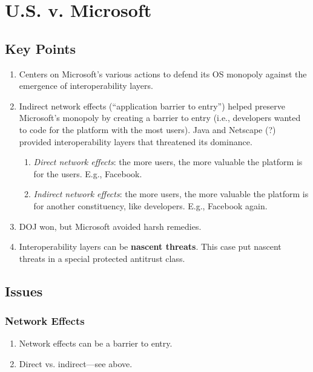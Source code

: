 \section{U.S. v. Microsoft}

\subsection{Key Points}

\begin{enumerate}
    \item Centers on Microsoft's various actions to defend its OS monopoly 
    against the emergence of interoperability layers.
    \item Indirect network effects (``application barrier to entry'') helped 
    preserve Microsoft's monopoly by creating a barrier to entry (i.e., 
    developers wanted to code for the platform with the most users). Java and 
    Netscape (?) provided interoperability layers that threatened its 
    dominance.
    \begin{enumerate}
        \item \emph{Direct network effects}: the more users, the more valuable 
        the platform is for the users. E.g., Facebook.
        \item \emph{Indirect network effects}: the more users, the more 
        valuable the platform is for another constituency, like developers. 
        E.g., Facebook again.
    \end{enumerate}
    \item DOJ won, but Microsoft avoided harsh remedies.
    \item Interoperability layers can be \textbf{nascent threats}. This case 
    put nascent threats in a special protected antitrust class.
\end{enumerate}

\subsection{Issues}

\subsubsection{Network Effects}

\begin{enumerate}
    \item Network effects can be a barrier to entry.
    \item Direct vs. indirect---see above.
\end{enumerate}

